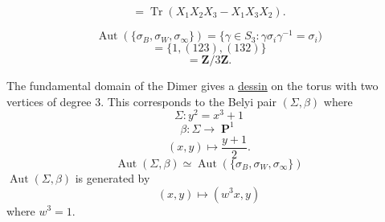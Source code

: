 \documentclass[10pt,]{book}
\numberwithin{equation}{section}
\newcommand{\inv}{^{-1}}
\newcommand{\ZZ}{\mathbf{Z}}
\DeclareMathOperator{\PP}{\mathbf{P}}
\DeclareMathOperator{\trace}{Tr}
\DeclareMathOperator{\Aut}{Aut}
\begin{document}
%
\begin{equation*}
= \trace(X_1X_2X_3 - X_1X_3X_2)\text{.}
\end{equation*}
%
\par
\hypertarget{p-778}{}%
%
\begin{equation*}
\Aut( \{\sigma_B,\sigma_W,\sigma_\infty\}) = \{ \gamma\in S_3: \gamma\sigma_i \gamma\inv = \sigma_i)
\end{equation*}
%
\begin{equation*}
= \{1,(123), (132)\}
\end{equation*}
%
\begin{equation*}
= \ZZ/3\ZZ\text{.}
\end{equation*}
%
\par
\hypertarget{p-779}{}%
The fundamental domain of the Dimer gives a \hyperref[def-dessin-denfant]{dessin} on the torus with two vertices of degree 3. This corresponds to the Belyi pair \((\Sigma, \beta)\) where%
\begin{equation*}
\Sigma \colon y^2 = x^3 + 1
\end{equation*}
%
\begin{equation*}
\beta \colon \Sigma  \to \PP^1
\end{equation*}
%
\begin{equation*}
(x,y) \mapsto \frac{y+1}{2}\text{.}
\end{equation*}
%
\begin{equation*}
\Aut(\Sigma, \beta) \simeq \Aut(\{\sigma_B,\sigma_W, \sigma_\infty\})
\end{equation*}
\(\Aut(\Sigma, \beta)\) is generated by%
\begin{equation*}
(x,y) \mapsto (w^3 x,y)
\end{equation*}
where \(w^3 = 1\).%
\end{document}
